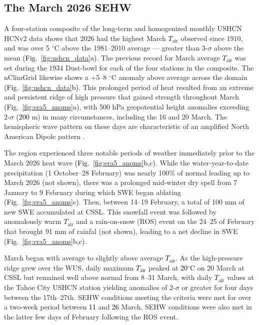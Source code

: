 \documentclass[draft]{agujournal2019}
\newcommand{\fig}[2]{\textcolor{black}{(Fig.~\ref{#1}{#2})}}   %
\newcommand{\mynum}[1]{\textcolor{black}{#1}}
\newcommand{\tair}{\textcolor{black}{$T_{\mathrm{air}}$}\xspace}
\newcommand{\degrc}{\textcolor{black}{$^\circ$C}\xspace}
\begin{document}
\subsection{The March 2026 SEHW}
A four-station composite of the long-term and homogenized monthly USHCN HCNv2 data shows that 2026 had the highest March \tair observed since 1910, and was over 5 $^\circ$C above the 1981--2010 average --- greater than 3-$\sigma$ above the mean \fig{fig:ushcn_data}{a}.
The previous record for March average \tair was set during the 1934 Dust-bowl \cite{Cook2014-ba} for each of the four stations in the composite. 
The nClimGrid likewise shows a +5--8 $^\circ$C anomaly above average across the domain \fig{fig:ushcn_data}{b}.
This prolonged period of heat resulted from an extreme and persistent ridge of high pressure that gained strength throughout March \fig{fig:era5_anoms}{a}, with 500 hPa geopotential height anomalies exceeding 2-$\sigma$ (\mynum{200} m) in many circumstances, including the 16 and 20 March.
The hemispheric wave pattern on these days are characteristic of an amplified North American Dipole pattern \cite{Wang2014,Wang2015,Singh2016-ev}.

The region experienced three notable periods of weather immediately prior to the March 2026 heat wave \fig{fig:era5_anoms}{b,c}. 
While the water-year-to-date precipitation (1 October--28 February) was nearly 100\% of normal leading up to March 2026 (not shown), there was a prolonged mid-winter dry spell \cite{Hatchett2023} from 7 January to 9 February during which SWE began ablating \fig{fig:era5_anoms}{c}.
Then, between 14--19 February, a total of 100 mm of new SWE accumulated at CSSL.
This snowfall event was followed by anomalously warm \tair and a rain-on-snow (ROS) event on the 24--25 of February that brought 91 mm of rainfal (not shown), leading to a net decline in SWE \fig{fig:era5_anoms}{b,c}. %

March began with average to slightly above average \tair.
As the high-pressure ridge grew over the WUS, daily maximum \tair peaked at \mynum{20}\degrc on 20 March at CSSL but remained well above normal from 8--31 March, with daily \tair values at the Tahoe City USHCN station yielding anomalies of 2-$\sigma$ or greater for four days between the 17th--27th.
SEHW conditions meeting the  criteria were met for over a two-week period between \mynum{11} and \mynum{26} March.
SEHW conditions were also met in the latter few days of February following the ROS event.
\end{document}
